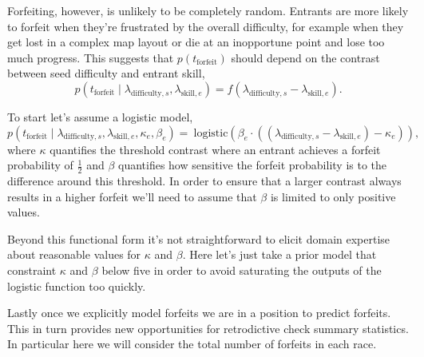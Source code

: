 \documentclass[
  letterpaper,
  DIV=11,
  numbers=noendperiod]{scrartcl}
\begin{document}
Forfeiting, however, is unlikely to be completely random. Entrants are
more likely to forfeit when they're frustrated by the overall
difficulty, for example when they get lost in a complex map layout or
die at an inopportune point and lose too much progress. This suggests
that \(p(t_{\mathrm{forfeit}})\) should depend on the contrast between
seed difficulty and entrant skill, \[
p(t_{\mathrm{forfeit}} \mid \lambda_{\mathrm{difficulty}, s},
                            \lambda_{\mathrm{skill}, e})
=
f(\lambda_{\mathrm{difficulty}, s} - \lambda_{\mathrm{skill}, e}).
\]

To start let's assume a logistic model, \[
p(t_{\mathrm{forfeit}} \mid \lambda_{\mathrm{difficulty}, s},
                            \lambda_{\mathrm{skill}, e},
                            \kappa_{e}, \beta_{e})
= \
\mathrm{logistic}( \beta_{e} \cdot (
                   (   \lambda_{\mathrm{difficulty}, s}
                     - \lambda_{\mathrm{skill}, e})
                    - \kappa_{e}     ) ),
\] where \(\kappa\) quantifies the threshold contrast where an entrant
achieves a forfeit probability of \(\frac{1}{2}\) and \(\beta\)
quantifies how sensitive the forfeit probability is to the difference
around this threshold. In order to ensure that a larger contrast always
results in a higher forfeit we'll need to assume that \(\beta\) is
limited to only positive values.

Beyond this functional form it's not straightforward to elicit domain
expertise about reasonable values for \(\kappa\) and \(\beta\). Here
let's just take a prior model that constraint \(\kappa\) and \(\beta\)
below five in order to avoid saturating the outputs of the logistic
function too quickly.

Lastly once we explicitly model forfeits we are in a position to predict
forfeits. This in turn provides new opportunities for retrodictive check
summary statistics. In particular here we will consider the total number
of forfeits in each race.
\end{document}
